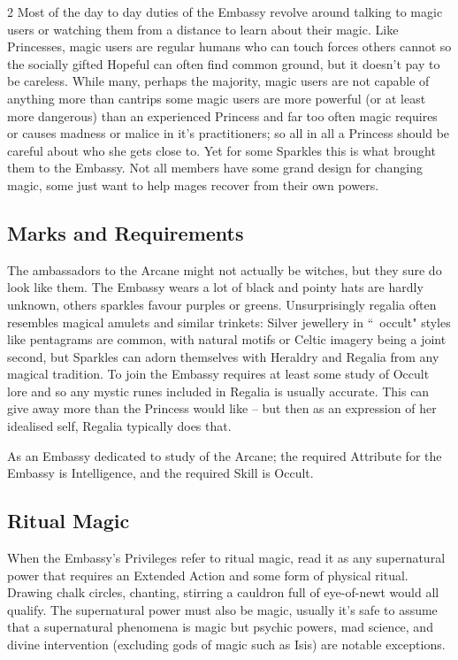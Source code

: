 \begin{multicols}{2}
Most of the day to day duties of the Embassy revolve around talking to magic users or watching them from a distance to learn about their magic. Like Princesses, magic users are regular humans who can touch forces others cannot so the socially gifted Hopeful can often find common ground, but it doesn’t pay to be careless. While many, perhaps the majority, magic users are not capable of anything more than cantrips some magic users are more powerful (or at least more dangerous) than an experienced Princess and far too often magic requires or causes madness or malice in it's practitioners; so all in all a Princess should be careful about who she gets close to. Yet for some Sparkles this is what brought them to the Embassy. Not all members have some grand design for changing magic, some just want to help mages recover from their own powers. 


\subsection*{Marks and Requirements}
The ambassadors to the Arcane might not actually be witches, but they sure do look like them. The Embassy wears a lot of black and pointy hats are hardly unknown, others sparkles favour purples or greens. Unsurprisingly regalia often resembles magical amulets and similar trinkets: Silver jewellery in \textquotedblleft\, occult" styles like pentagrams are common, with natural motifs or Celtic imagery being a joint second, but Sparkles can adorn themselves with Heraldry and Regalia from any magical tradition. To join the Embassy requires at least some study of Occult lore and so any mystic runes included in Regalia is usually accurate. This can give away more than the Princess would like – but then as an expression of her idealised self, Regalia typically does that. 

As an Embassy dedicated to study of the Arcane; the required Attribute for the Embassy is Intelligence, and the required Skill is Occult. 

\begin{mybox}

\subsection*{Ritual Magic}

When the Embassy's Privileges refer to ritual magic, read it as any supernatural power that requires an Extended Action and some form of physical ritual. Drawing chalk circles, chanting, stirring a cauldron full of eye-of-newt would all qualify. The supernatural power must also be magic, usually it's safe to assume that a supernatural phenomena is magic but psychic powers, mad science, and divine intervention (excluding gods of magic such as Isis) are notable exceptions.


\end{mybox}
\end{multicols}

